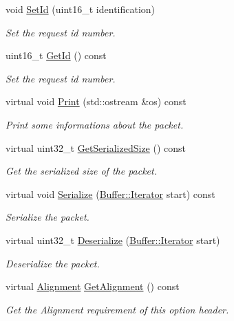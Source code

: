\begin{DoxyCompactItemize}
void \hyperlink{classns3_1_1dsr_1_1DsrOptionRreqHeader_af01074819531d7b2a8569fe466f925cb}{Set\+Id} (uint16\+\_\+t identification)
\begin{DoxyCompactList}\small\item\em Set the request id number. \end{DoxyCompactList}\item 
uint16\+\_\+t \hyperlink{classns3_1_1dsr_1_1DsrOptionRreqHeader_aec1e32e0e8bace1003424140900d53a9}{Get\+Id} () const 
\begin{DoxyCompactList}\small\item\em Set the request id number. \end{DoxyCompactList}\item 
virtual void \hyperlink{classns3_1_1dsr_1_1DsrOptionRreqHeader_af4a3ec49e69e60847f0ec7a884fbd5dc}{Print} (std\+::ostream \&os) const 
\begin{DoxyCompactList}\small\item\em Print some informations about the packet. \end{DoxyCompactList}\item 
virtual uint32\+\_\+t \hyperlink{classns3_1_1dsr_1_1DsrOptionRreqHeader_a59c68025fee70452ca93348d5ab7e47f}{Get\+Serialized\+Size} () const 
\begin{DoxyCompactList}\small\item\em Get the serialized size of the packet. \end{DoxyCompactList}\item 
virtual void \hyperlink{classns3_1_1dsr_1_1DsrOptionRreqHeader_a620cbf122e8637ec0a22ec3882176816}{Serialize} (\hyperlink{classns3_1_1Buffer_1_1Iterator}{Buffer\+::\+Iterator} start) const 
\begin{DoxyCompactList}\small\item\em Serialize the packet. \end{DoxyCompactList}\item 
virtual uint32\+\_\+t \hyperlink{classns3_1_1dsr_1_1DsrOptionRreqHeader_a7cf6a4240408c554fe4ca6ea9b266651}{Deserialize} (\hyperlink{classns3_1_1Buffer_1_1Iterator}{Buffer\+::\+Iterator} start)
\begin{DoxyCompactList}\small\item\em Deserialize the packet. \end{DoxyCompactList}\item 
virtual \hyperlink{structns3_1_1dsr_1_1DsrOptionHeader_1_1Alignment}{Alignment} \hyperlink{classns3_1_1dsr_1_1DsrOptionRreqHeader_aa7cd1b5a30a7e693e38b5a0f7d6e1d11}{Get\+Alignment} () const 
\begin{DoxyCompactList}\small\item\em Get the Alignment requirement of this option header. \end{DoxyCompactList}\end{DoxyCompactItemize}
